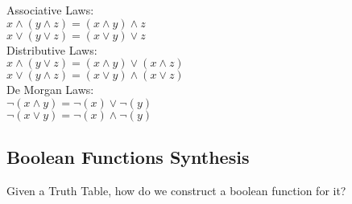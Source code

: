 Associative Laws:\\

$x \land (y \land z) = (x \land y) \land z$\\
$x \lor (y \lor z) = (x \lor y) \lor z$\\

Distributive Laws:\\

$x \land (y \lor z) = (x \land y) \lor (x \land z)$\\
$x \lor (y \land z) = (x \lor y) \land (x \lor z)$\\

De Morgan Laws:\\

$\neg(x \land y) = \neg(x) \lor \neg(y)$\\
$\neg(x \lor y) = \neg(x) \land \neg(y)$\\

\subsection{Boolean Functions Synthesis}

Given a Truth Table, how do we construct a boolean function for it?
